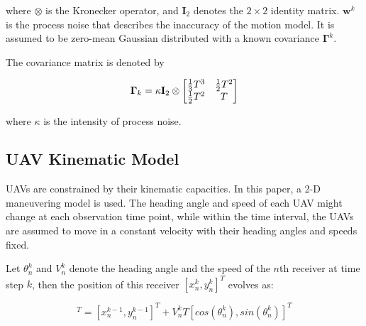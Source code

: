 \documentclass[12pt,journal,draftclsnofoot,onecolumn]{IEEEtran}
\begin{document}
where $\otimes$ is the Kronecker operator, and $\mathbf{I}_2$ denotes the $2\times 2$ identity matrix. $\mathbf{w}^k$ is the process noise that describes the inaccuracy of the motion model. It is assumed to be zero-mean Gaussian distributed with a known covariance $\mathbf{\Gamma}^k$.

The covariance matrix is denoted by

\begin{equation}
    {\bf \Gamma}_{k}=\kappa {\bf I}_{2}\otimes\left[\begin{matrix} {1\over 3}T^{3}&{1\over 2}T^{2}\\ {1\over 2}T^{2}&T\end{matrix}\right]
\end{equation}
 
where $\kappa$ is the intensity of process noise.


\subsection{UAV Kinematic Model}
UAVs are constrained by their kinematic capacities. In this paper, a 2-D maneuvering model is used. The heading angle and speed of each UAV might change at each observation time point, while within the time interval, the UAVs are assumed to move in a constant velocity with their heading angles and speeds fixed. 

Let $\theta_n^k$ and $V_n^k$ denote the heading angle and the speed of the $n$th receiver at time step $k$, then the position of this receiver $[x_n^k, y_n^k]^T$ evolves as:

\begin{equation}
    [x_n^k, y_n^k]^T=[x_n^{k-1}, y_n^{k-1}]^T+V_n^kT[cos(\theta _n^k), sin(\theta _n^k)]^T
    \label{UAV model}
\end{equation}
\end{document}
